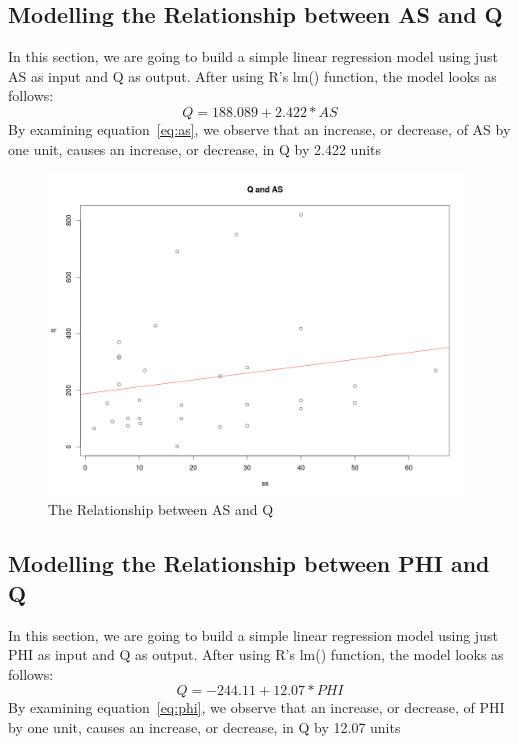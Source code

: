 \documentclass[a4paper,12pt, english]{article}
\begin{document}
\subsection{Modelling the Relationship between AS and Q} 
In this section, we are going to build a simple linear regression model using just AS as input and Q as output. After using R's lm() function, the model looks as follows:\\
\begin{equation}
\label{eq:as}
Q = 188.089   +     2.422*AS 
\end{equation}       
By examining equation~\ref{eq:as}, we observe that an increase, or decrease, of AS by one unit, causes an increase, or decrease, in Q by 2.422 units

\begin{figure}[htp!]
  \centering
  \includegraphics[width=0.986\textwidth]{as-line}
  \caption{The Relationship between AS and Q}
  \label{fig:as-line}
\end{figure}

\subsection{Modelling the Relationship between PHI and Q} 
In this section, we are going to build a simple linear regression model using just PHI as input and Q as output. After using R's lm() function, the model looks as follows:\\
\begin{equation}
\label{eq:phi}
Q =  -244.11    +    12.07*PHI 
\end{equation}       
By examining equation~\ref{eq:phi}, we observe that an increase, or decrease, of PHI by one unit, causes an increase, or decrease, in Q by 12.07 units
\end{document}
